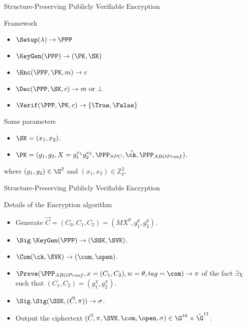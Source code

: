 \begin{frame}{Structure-Preserving Publicly Verifiable Encryption}
  \begin{block}{Framework}
    \begin{itemize}
    \item $\Setup(\lambda) \to \PPP$
    \item $\KeyGen(\PPP) \to (\PK, \SK)$
    \item $\Enc(\PPP, \PK, m) \to c$
    \item $\Dec(\PPP, \SK, c) \to m \mbox{ or } \bot$
    \item $\Verif(\PPP, \PK, c) \to \{\True, \False\}$
    \end{itemize}
  \end{block}

  \begin{block}{Some parameters}
    
    \begin{itemize}
    \item $\SK = (x_1, x_2)$.
    \item $\PK = (g_1, g_2, X = g_1^{x_1}g_2^{x_2}, \PPP_{SPC}, \vec{\ck}, \PPP_{ABOProof})$.
    \end{itemize}
    where $(g_1, g_2) \in \G^2$ and $(x_1, x_2) \in \mathbb{Z}_p^2$.
  \end{block}
  
\end{frame}

\begin{frame}{Structure-Preserving Publicly Verifiable Encryption}
  \begin{block}{Details of the Encryption algorithm}
    
    \begin{itemize}
    \item Generate $\vec{C} = (C_0, C_1, C_2) = (MX^{\theta}, g_1^{\theta},  g_2^{\theta})$.
    \item $\Sig.\KeyGen(\PPP) \to (\SSK, \SVK)$.
    \item $\Com(\ck, \SVK) \to (\com, \open)$.
    \item $\Prove(\PPP_{ABOProof}, x = (C_1, C_2), w = \theta, tag = \com) \to \pi$ of the fact $\exists \chi$ such that $(C_1, C_2) = (g_1^\chi, g_2^\chi)$.
    \item $\Sig.\Sig(\SSK,(\vec{C},\pi)) \to \sigma$.
    \item Output the ciphertext $(\vec{C}, \pi, \SVK, \com, \open, \sigma) \in \G^{16} \times \hat{\G}^{11}$.
    \end{itemize}

  \end{block}
\end{frame}



